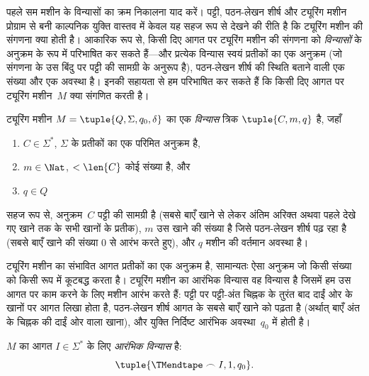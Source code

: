 \documentclass[../../../include/open-logic-section]{subfiles}
\begin{document}

\begin{explain}
पहले सम मशीन के विन्यासों का क्रम निकालना याद करें। पट्टी, पठन-लेखन
शीर्ष और ट्यूरिंग मशीन प्रोग्राम से बनी काल्पनिक युक्ति वास्तव में केवल
यह सहज रूप से देखने की रीति है कि ट्यूरिंग मशीन की संगणना क्या होती है।
आकारिक रूप से, किसी दिए आगत पर ट्यूरिंग मशीन की संगणना को
\emph{विन्यासों} के अनुक्रम के रूप में परिभाषित कर सकते हैं---और प्रत्येक
विन्यास स्वयं प्रतीकों का एक अनुक्रम (जो संगणना के उस बिंदु पर पट्टी की
सामग्री के अनुरूप है), पठन-लेखन शीर्ष की स्थिति बताने वाली एक संख्या और
एक अवस्था है। इनकी सहायता से हम परिभाषित कर सकते हैं कि किसी दिए आगत पर
ट्यूरिंग मशीन~$M$ क्या संगणित करती है।
\end{explain}

\begin{defn}[विन्यास]
ट्यूरिंग मशीन $M = \tuple{Q, \Sigma, q_0,
\delta}$ का एक
\emph{विन्यास} त्रिक $\tuple{C, m, q}$ है, जहाँ
\begin{enumerate}
\item $C \in \Sigma^*$, $\Sigma$ के प्रतीकों का एक परिमित अनुक्रम है,
\item $m \in \Nat$, $< \len{C}$ कोई संख्या है, और
\item $q \in Q$
\end{enumerate}
सहज रूप से, अनुक्रम~$C$ पट्टी की सामग्री है (सबसे बाएँ खाने से लेकर
अंतिम अरिक्त अथवा पहले देखे गए खाने तक के सभी खानों के प्रतीक), $m$ उस
खाने की संख्या है जिसे पठन-लेखन शीर्ष पढ़ रहा है (सबसे बाएँ खाने की
संख्या $0$ से आरंभ करते हुए), और $q$ मशीन की वर्तमान अवस्था है।
\end{defn}

\begin{explain}
ट्यूरिंग मशीन का संभावित आगत प्रतीकों का एक अनुक्रम है, सामान्यतः ऐसा
अनुक्रम जो किसी संख्या को किसी रूप में कूटबद्ध करता है। ट्यूरिंग मशीन का
आरंभिक विन्यास वह विन्यास है जिसमें हम उस आगत पर काम करने के लिए मशीन
आरंभ करते हैं: पट्टी पर पट्टी-अंत चिह्नक के तुरंत बाद दाईं ओर के खानों
पर आगत लिखा होता है, पठन-लेखन शीर्ष आगत के सबसे बाएँ खाने को पढ़ता है
(अर्थात् बाएँ अंत के चिह्नक की दाईं ओर वाला खाना), और युक्ति निर्दिष्ट
आरंभिक अवस्था~$q_0$ में होती है।
\end{explain}

\begin{defn}[आरंभिक विन्यास]
$M$ का आगत $I \in \Sigma^*$ के लिए \emph{आरंभिक विन्यास} है:
\[
\tuple{\TMendtape \frown I, 1, q_0}.
\]
\end{defn}
\end{document}
